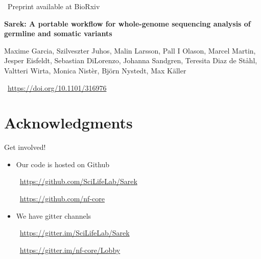 \documentclass[usepdftitle=false]{beamer}
\begin{document}
\begin{frame}{\faWrench\ Preprint available at BioRxiv}

	\textbf{Sarek: A portable workflow for whole-genome sequencing analysis of germline and somatic variants}

	\small{Maxime Garcia,
	Szilveszter Juhos,
	Malin Larsson,
	Pall I Olason,
	Marcel Martin,
	Jesper Eisfeldt,
	Sebastian DiLorenzo,
	Johanna Sandgren,
	Teresita Diaz de Ståhl,
	Valtteri Wirta,
	Monica Nistèr,
	Björn Nystedt,
	Max Käller}

	\aiDoi\ \url{https://doi.org/10.1101/316976}
\end{frame}

\section{Acknowledgments}

\begin{frame}{Get involved!}
	\begin{itemize}
		\item Our code is hosted on Github

		\faGithub\ \url{https://github.com/SciLifeLab/Sarek}

		\faGithub\ \url{https://github.com/nf-core}
	\end{itemize}
	\pause
	\begin{itemize}
		\item We have gitter channels

		\faGroup\ \url{https://gitter.im/SciLifeLab/Sarek}

		\faGroup\ \url{https://gitter.im/nf-core/Lobby}
	\end{itemize}
\end{frame}
\end{document}
